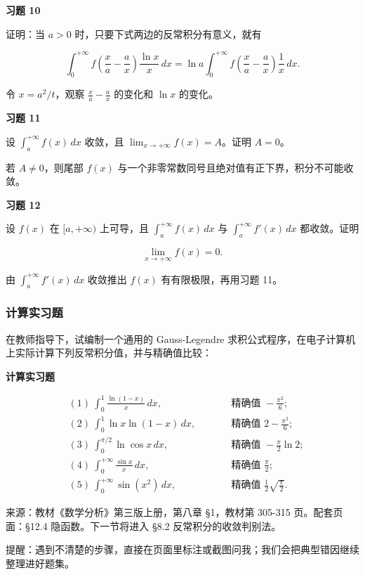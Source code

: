 \begin{exercisebox}
\textbf{习题 10 }

证明：当 \(a>0\) 时，只要下式两边的反常积分有意义，就有

\[
        \int_0^{+\infty}
        f\!\left(\frac{x}{a}-\frac{a}{x}\right)
        \frac{\ln x}{x}\,dx
        =
        \ln a
        \int_0^{+\infty}
        f\!\left(\frac{x}{a}-\frac{a}{x}\right)
        \frac{1}{x}\,dx.
      \]

\begin{hintbox}
令 \(x=a^2/t\)，观察 \(\frac{x}{a}-\frac{a}{x}\) 的变化和 \(\ln x\) 的变化。
\end{hintbox}
\end{exercisebox}

\begin{exercisebox}
\textbf{习题 11 }

设 \(\int_a^{+\infty}f(x)\,dx\) 收敛，且 \(\lim_{x\to+\infty}f(x)=A\)。证明 \(A=0\)。

\begin{hintbox}
若 \(A\ne0\)，则尾部 \(f(x)\) 与一个非零常数同号且绝对值有正下界，积分不可能收敛。
\end{hintbox}
\end{exercisebox}

\begin{exercisebox}
\textbf{习题 12 }

设 \(f(x)\) 在 \([a,+\infty)\) 上可导，且 \(\int_a^{+\infty}f(x)\,dx\) 与 \(\int_a^{+\infty}f'(x)\,dx\) 都收敛。证明

\[
        \lim_{x\to+\infty}f(x)=0.
      \]

\begin{hintbox}
由 \(\int_a^{+\infty}f'(x)\,dx\) 收敛推出 \(f(x)\) 有有限极限，再用习题 11。
\end{hintbox}
\end{exercisebox}

\subsubsection*{计算实习题}

在教师指导下，试编制一个通用的 Gauss-Legendre 求积公式程序，在电子计算机上实际计算下列反常积分值，并与精确值比较：

\begin{exercisebox}
\textbf{计算实习题 }

\[
      \begin{aligned}
      &(1)\ \int_0^1\frac{\ln(1-x)}{x}\,dx,\qquad &&\text{精确值 }-\frac{\pi^2}{6};\\
      &(2)\ \int_0^1\ln x\ln(1-x)\,dx,\qquad &&\text{精确值 }2-\frac{\pi^2}{6};\\
      &(3)\ \int_0^{\pi/2}\ln\cos x\,dx,\qquad &&\text{精确值 }-\frac{\pi}{2}\ln2;\\
      &(4)\ \int_0^{+\infty}\frac{\sin x}{x}\,dx,\qquad &&\text{精确值 }\frac{\pi}{2};\\
      &(5)\ \int_0^{+\infty}\sin(x^2)\,dx,\qquad &&\text{精确值 }\frac12\sqrt{\frac{\pi}{2}}.
      \end{aligned}
      \]
\end{exercisebox}

来源：教材《数学分析》第三版上册，第八章 §1，教材第 305-315 页。配套页面：§12.4 隐函数。下一节将进入 §8.2 反常积分的收敛判别法。

提醒：遇到不清楚的步骤，直接在页面里标注或截图问我；我们会把典型错因继续整理进好题集。
